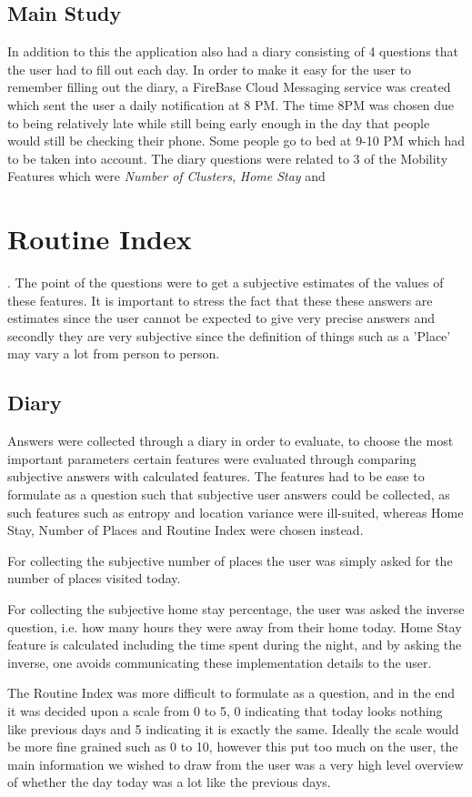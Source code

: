 \subsection{Main Study}
 In addition to this the application also had a diary consisting of 4 questions that the user had to fill out each day. In order to make it easy for the user to remember filling out the diary, a FireBase Cloud Messaging service was created which sent the user a daily notification at 8 PM. The time 8PM was chosen due to being relatively late while still being early enough in the day that people would still be checking their phone. Some people go to bed at 9-10 PM which had to be taken into account. The diary questions were related to 3 of the Mobility Features which were \textit{Number of Clusters}, \textit{Home Stay} and \section{Routine Index}. The point of the questions were to get a subjective estimates of the values of these features. It is important to stress the fact that these these answers are estimates since the user cannot be expected to give very precise answers and secondly they are very subjective since the definition of things such as a 'Place' may vary a lot from person to person.

\subsection{Diary}
Answers were collected through a diary in order to evaluate, to choose the most important parameters certain features were evaluated through comparing subjective answers with calculated features. The features had to be ease to formulate as a question such that subjective user answers could be collected, as such features such as entropy and location variance were ill-suited, whereas Home Stay, Number of Places and Routine Index were chosen instead. 

For collecting the subjective number of places the user was simply asked for the number of places visited today. 

For collecting the subjective home stay percentage, the user was asked the inverse question, i.e. how many hours they were away from their home today. Home Stay feature is calculated including the time spent during the night, and by asking the inverse, one avoids communicating these implementation details to the user. 

The Routine Index was more difficult to formulate as a question, and in the end it was decided upon a scale from 0 to 5, 0 indicating that today looks nothing like previous days and 5 indicating it is exactly the same. Ideally the scale would be more fine grained such as 0 to 10, however this put too much on the user, the main information we wished to draw from the user was a very high level overview of whether the day today was a lot like the previous days.


